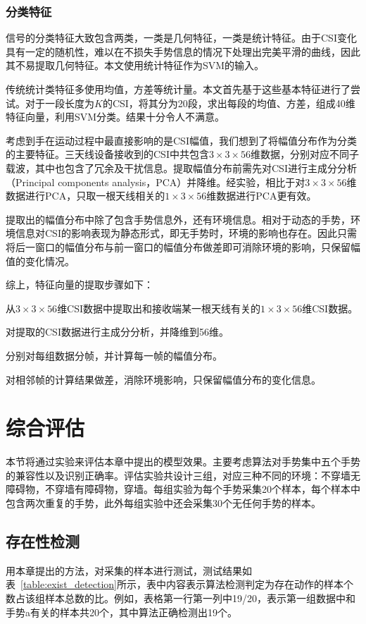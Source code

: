 \subsubsection{分类特征}
信号的分类特征大致包含两类，一类是几何特征，一类是统计特征。由于CSI变化具有一定的随机性，难以在不损失手势信息的情况下处理出完美平滑的曲线，因此其不易提取几何特征。本文使用统计特征作为SVM的输入。

传统统计类特征多使用均值，方差等统计量。本文首先基于这些基本特征进行了尝试。对于一段长度为$K$的CSI，将其分为20段，求出每段的均值、方差，组成40维特征向量，利用SVM分类。结果十分令人不满意。

考虑到手在运动过程中最直接影响的是CSI幅值，我们想到了将幅值分布作为分类的主要特征。三天线设备接收到的CSI中共包含$3 \times 3 \times 56$维数据，分别对应不同子载波，其中也包含了冗余及干扰信息。提取幅值分布前需先对CSI进行主成分分析（Principal components analysis，PCA）并降维。经实验，相比于对$3 \times 3 \times 56$维数据进行PCA，只取一根天线相关的$1 \times 3 \times 56$维数据进行PCA更有效。

提取出的幅值分布中除了包含手势信息外，还有环境信息。相对于动态的手势，环境信息对CSI的影响表现为静态形式，即无手势时，环境的影响也存在。因此只需将后一窗口的幅值分布与前一窗口的幅值分布做差即可消除环境的影响，只保留幅值的变化情况。

综上，特征向量的提取步骤如下：

\begin{compactenum}
\item 从$3 \times 3 \times 56$维CSI数据中提取出和接收端某一根天线有关的$1 \times 3 \times 56$维CSI数据。
\item 对提取的CSI数据进行主成分分析，并降维到56维。
\item 分别对每组数据分帧，并计算每一帧的幅值分布。
\item 对相邻帧的计算结果做差，消除环境影响，只保留幅值分布的变化信息。
\end{compactenum}

\section{综合评估}
本节将通过实验来评估本章中提出的模型效果。主要考虑算法对手势集中五个手势的兼容性以及识别正确率。评估实验共设计三组，对应三种不同的环境：不穿墙无障碍物，不穿墙有障碍物，穿墙。每组实验为每个手势采集20个样本，每个样本中包含两次重复的手势，此外每组实验中还会采集30个无任何手势的样本。

\subsection{存在性检测}
用本章提出的方法，对采集的样本进行测试，测试结果如表~\ref{table:exist_detection}所示，表中内容表示算法检测判定为存在动作的样本个数占该组样本总数的比。例如，表格第一行第一列中19/20，表示第一组数据中和手势a有关的样本共20个，其中算法正确检测出19个。

